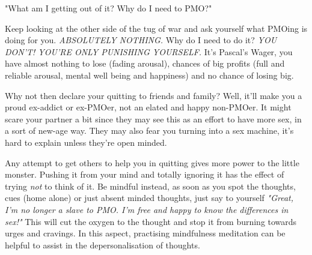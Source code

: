 \documentclass[easypeasy.tex]{subfiles}
\begin{document}
  {\Large "What am I getting out of it? Why do I need to PMO?"}

Keep looking at the other side of the tug of war and ask yourself what PMOing is doing for you. \textit{ABSOLUTELY NOTHING.} Why do I need to do it? \textit{YOU DON'T! YOU'RE ONLY PUNISHING YOURSELF.} It's Pascal's Wager, you have almost nothing to lose (fading arousal), chances of big profits (full and reliable arousal, mental well being and happiness) and no chance of losing big.

Why not then declare your quitting to friends and family? Well, it'll make you a proud ex-addict or ex-PMOer, not an elated and happy non-PMOer. It might scare your partner a bit since they may see this as an effort to have more sex, in a sort of new-age way. They may also fear you turning into a sex machine, it's hard to explain unless they're open minded.

    Any attempt to get others to help you in quitting gives more power to the little monster. Pushing it from your mind and totally ignoring it has the effect of trying \textit{not} to think of it. Be mindful instead, as soon as you spot the thoughts, cues (home alone) or just absent minded thoughts, just say to yourself \textit{"Great, I'm no longer a slave to PMO. I'm free and happy to know the differences in sex!"} This will cut the oxygen to the thought and stop it from burning towards urges and cravings. In this aspect, practising mindfulness meditation can be helpful to assist in the depersonalisation of thoughts.
\end{document}
